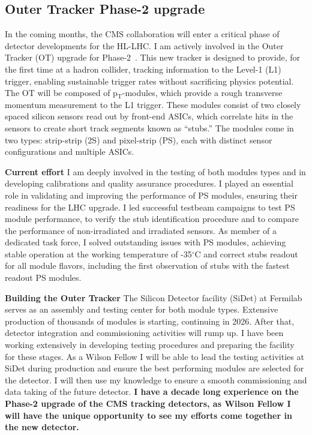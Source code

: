 {\begin{flushleft}
\subsection{Outer Tracker Phase-2 upgrade}
\vskip 5pt 
In the coming months, the CMS collaboration will enter a critical phase of detector developments for the HL-LHC. I am actively involved in the Outer Tracker (OT) upgrade for Phase-2~\cite{[5]}. This new tracker is designed to provide, for the first time at a hadron collider, tracking information to the Level-1 (L1) trigger, enabling sustainable trigger rates without sacrificing physics potential. The OT will be composed of p$_{\mathrm{T}}$-modules, which provide a rough transverse momentum measurement to the L1 trigger. These modules consist of two closely spaced silicon sensors read out by front-end ASICs, which correlate hits in the sensors to create short track segments known as ``stubs.'' The modules come in two types: strip-strip (2S) and pixel-strip (PS), each with distinct sensor configurations and multiple ASICs.

\textbf{Current effort}
I am deeply involved in the testing of both modules types and in developing calibrations and quality assurance procedures. I played an essential role in validating and improving the performance of PS modules, ensuring their readiness for the LHC upgrade. I led successful testbeam campaigns to test PS module performance, to verify the stub identification procedure and to compare the performance of non-irradiated and irradiated sensors. As member of a dedicated task force, I solved outstanding issues with PS modules, achieving stable operation at the working temperature of -35$^{\circ}$C and correct stubs readout for all module flavors, including the first observation of stubs with the fastest readout PS modules.  

\textbf{Building the Outer Tracker}
The Silicon Detector facility (SiDet) at Fermilab serves as an assembly and testing center for both module types. Extensive production of thousands of modules is starting, continuing in 2026. After that, detector integration and commissioning activities will rump up. I have been working extensively in developing testing procedures and preparing the facility for these stages. As a Wilson Fellow I will be able to lead the testing activities at SiDet during production and ensure the best performing modules are selected for the detector. I will then use my knowledge to ensure a smooth commissioning and data taking of the future detector.
\textbf{I have a decade long experience on the Phase-2 upgrade of the CMS tracking detectors, as Wilson Fellow I will have the unique opportunity to see my efforts come together in the new detector.} 



\end{flushleft}}
